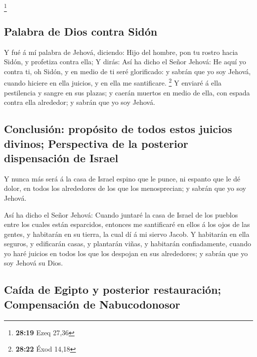 \footnote{\textbf{28:19} Ezeq 27,36}

\hypertarget{palabra-de-dios-contra-siduxf3n}{%
\subsection{Palabra de Dios contra
Sidón}\label{palabra-de-dios-contra-siduxf3n}}

 Y fué á mí palabra de Jehová, diciendo: 
Hijo del hombre, pon tu rostro hacia Sidón, y profetiza contra ella;
 Y dirás: Así ha dicho el Señor Jehová: He aquí yo contra
ti, oh Sidón, y en medio de ti seré glorificado: y sabrán que yo soy
Jehová, cuando hiciere en ella juicios, y en ella me santificare.
\footnote{\textbf{28:22} Éxod 14,18}  Y enviaré á ella
pestilencia y sangre en sus plazas; y caerán muertos en medio de ella,
con espada contra ella alrededor; y sabrán que yo soy Jehová.

\hypertarget{conclusiuxf3n-propuxf3sito-de-todos-estos-juicios-divinos-perspectiva-de-la-posterior-dispensaciuxf3n-de-israel}{%
\subsection{Conclusión: propósito de todos estos juicios divinos;
Perspectiva de la posterior dispensación de
Israel}\label{conclusiuxf3n-propuxf3sito-de-todos-estos-juicios-divinos-perspectiva-de-la-posterior-dispensaciuxf3n-de-israel}}

 Y nunca más será á la casa de Israel espino que le
punce, ni espanto que le dé dolor, en todos los alrededores de los que
los menosprecian; y sabrán que yo soy Jehová.

 Así ha dicho el Señor Jehová: Cuando juntaré la casa de
Israel de los pueblos entre los cuales están esparcidos, entonces me
santificaré en ellos á los ojos de las gentes, y habitarán en su tierra,
la cual dí á mi siervo Jacob.  Y habitarán en ella
seguros, y edificarán casas, y plantarán viñas, y habitarán
confiadamente, cuando yo haré juicios en todos los que los despojan en
sus alrededores; y sabrán que yo soy Jehová su Dios.

\hypertarget{cauxedda-de-egipto-y-posterior-restauraciuxf3n-compensaciuxf3n-de-nabucodonosor}{%
\subsection{Caída de Egipto y posterior restauración; Compensación de
Nabucodonosor}\label{cauxedda-de-egipto-y-posterior-restauraciuxf3n-compensaciuxf3n-de-nabucodonosor}}

